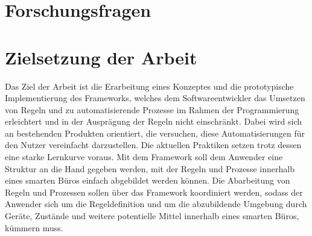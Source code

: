 \section{Forschungsfragen}
\label{sec:forschungsfragen}


\section{Zielsetzung der Arbeit}
\label{sec:zielsetzung}
    Das Ziel der Arbeit ist die Erarbeitung eines Konzeptes und die prototypische Implementierung des Frameworks, welches dem Softwareentwickler das 
    Umsetzen von Regeln und zu automatisierende Prozesse im Rahmen der Programmierung erleichtert und in der Ausprägung 
    der Regeln nicht einschränkt. Dabei wird sich an bestehenden Produkten orientiert, die versuchen, diese 
    Automatisierungen für den Nutzer vereinfacht darzustellen. Die aktuellen Praktiken setzen trotz dessen eine starke Lernkurve voraus. 
    Mit dem Framework soll dem Anwender eine Struktur an die Hand gegeben werden, mit der Regeln und Prozesse innerhalb eines 
    smarten Büros einfach abgebildet werden können. Die Abarbeitung von Regeln und Prozessen sollen über das Framework 
    koordiniert werden, sodass der Anwender sich um die Regeldefinition und um die abzubildende Umgebung durch Geräte, Zustände und weitere 
    potentielle Mittel innerhalb eines smarten Büros, kümmern muss. 

